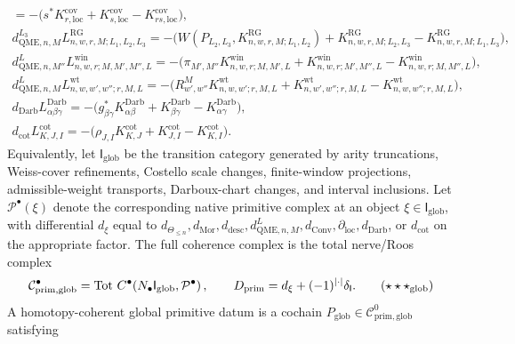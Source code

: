 \begin{defn}
\[\begin{gathered}
    =
    -\bigl(s^*K^{\mathrm{cov}}_{r,\mathrm{loc}}
      +K^{\mathrm{cov}}_{s,\mathrm{loc}}
      -K^{\mathrm{cov}}_{rs,\mathrm{loc}}\bigr),\\
    d^{L_3}_{\mathrm{QME},n,M}L^{\mathrm{RG}}_{n,w,r,M;L_1,L_2,L_3}
    =
    -\bigl(W(P_{L_2,L_3},K^{\mathrm{RG}}_{n,w,r,M;L_1,L_2})
      +K^{\mathrm{RG}}_{n,w,r,M;L_2,L_3}
      -K^{\mathrm{RG}}_{n,w,r,M;L_1,L_3}\bigr),\\
    d^{L}_{\mathrm{QME},n,M''}L^{\mathrm{win}}_{n,w,r;M,M',M'',L}
    =
    -\bigl(\pi_{M',M''}K^{\mathrm{win}}_{n,w,r;M,M',L}
      +K^{\mathrm{win}}_{n,w,r;M',M'',L}
      -K^{\mathrm{win}}_{n,w,r;M,M'',L}\bigr),\\
    d^{L}_{\mathrm{QME},n,M}L^{\mathrm{wt}}_{n,w,w',w'';r,M,L}
    =
    -\bigl(R^M_{w',w''}K^{\mathrm{wt}}_{n,w,w';r,M,L}
      +K^{\mathrm{wt}}_{n,w',w'';r,M,L}
      -K^{\mathrm{wt}}_{n,w,w'';r,M,L}\bigr),\\
    d_{\mathrm{Darb}}L^{\mathrm{Darb}}_{\alpha\beta\gamma}
    =
    -\bigl(g_{\beta\gamma}^*K^{\mathrm{Darb}}_{\alpha\beta}
      +K^{\mathrm{Darb}}_{\beta\gamma}
      -K^{\mathrm{Darb}}_{\alpha\gamma}\bigr),\\
    d_{\mathrm{cot}}L^{\mathrm{cot}}_{K,J,I}
    =
    -\bigl(\rho_{J,I}K^{\mathrm{cot}}_{K,J}
      +K^{\mathrm{cot}}_{J,I}
      -K^{\mathrm{cot}}_{K,I}\bigr).
  \end{gathered}
	  \]
  Equivalently, let \(\mathsf I_{\mathrm{glob}}\) be the transition
  category generated by arity truncations, Weiss-cover refinements,
  Costello scale changes, finite-window projections, admissible-weight
  transports, Darboux-chart changes, and interval inclusions.  Let
  \(\mathcal P^\bullet(\xi)\) denote the corresponding native primitive
	  complex at an object \(\xi\in\mathsf I_{\mathrm{glob}}\), with
	  differential \(d_\xi\) equal to
  \(d_{\Theta_{\le n}},d_{\mathrm{Mor}},d_{\mathrm{desc}},
  d^{L}_{\mathrm{QME},n,M},d_{\mathrm{Conv}},\partial_{\mathrm{loc}},
  d_{\mathrm{Darb}}\), or \(d_{\mathrm{cot}}\) on the appropriate
  factor.  The full coherence complex is the total
  nerve/Roos complex
  \[
    \mathcal C^\bullet_{\mathrm{prim,glob}}
    =
    \operatorname{Tot}\,
    C^\bullet\!\left(
      N_\bullet\mathsf I_{\mathrm{glob}},
      \mathcal P^\bullet\right),
    \qquad
    D_{\mathrm{prim}}=d_\xi+(-1)^{|\cdot|}\delta_{\mathsf I}.
  \tag{\(\star\star\star_{\mathrm{glob}}\)}
  \label{eq:global-all-simplex-primitive-compatibility-datum}
  \]
  A homotopy-coherent global primitive datum is a cochain
  \(P_{\mathrm{glob}}\in\mathcal C^0_{\mathrm{prim,glob}}\) satisfying

\end{defn}
